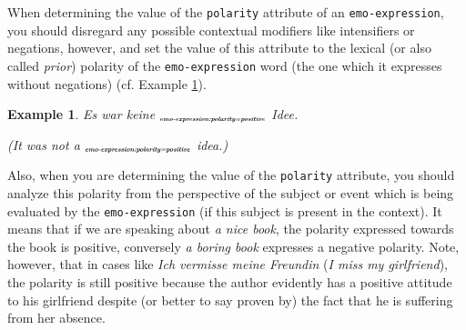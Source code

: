 \documentclass[11pt,a4paper]{article}
\theoremstyle{mytheoremstyle}
\newtheorem{exmp}{Example}[section]
\newcommand{\mtag}[2]{{\upshape[\emph{#2}\upshape]$_{\textrm{\bfseries\emph{\tiny
        #1}}}$}}
\newcommand{\emoexpression}[2][]{\mtag{emo-\-ex\-pression\ifstrempty{#1}{}{:#1}}{#2}}
\begin{document}
When determining the value of the \texttt{polarity} attribute of an
\texttt{emo-expression}, you should disregard any possible contextual
modifiers like intensifiers or negations, however, and set the value
of this attribute to the lexical (or also called \emph{prior})
polarity of the \texttt{emo-expression} word (the one which it
expresses without negations) (cf. Example
\ref{exmp:emo-expression-polarity}).
\begin{exmp}
Es war keine \emoexpression[polarity=positive]{gute} Idee.

(It was not a \emoexpression[polarity=positive]{good} idea.)\label{exmp:emo-expression-polarity}
\end{exmp}

Also, when you are determining the value of the \texttt{polarity}
attribute, you should analyze this polarity from the perspective of
the subject or event which is being evaluated by the
\texttt{emo-expression} (if this subject is present in the context).
It means that if we are speaking about \textit{a nice book}, the
polarity expressed towards the book is positive, conversely \textit{a
  boring book} expresses a negative polarity.  Note, however, that in
cases like \textit{Ich vermisse meine Freundin} (\textit{I miss my
  girlfriend}), the polarity is still positive because the author
evidently has a positive attitude to his girlfriend despite (or better
to say proven by) the fact that he is suffering from her absence.
\end{document}
